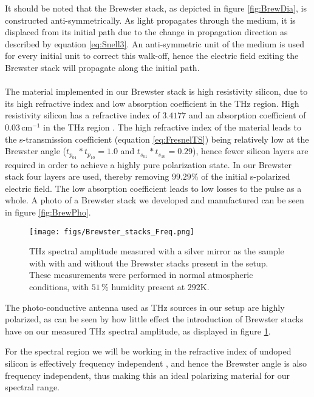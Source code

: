 It should be noted that the Brewster stack, as depicted in figure \ref{fig:BrewDia}, is constructed anti-symmetrically. As light propagates through the medium, it is displaced from its initial path due to the change in propagation direction as described by equation \ref{eq:Snell3}. An anti-symmetric unit of the medium is used for every initial unit to correct this walk-off, hence the electric field exiting the Brewster stack will propagate along the initial path.
\paragraph{}
The material implemented in our Brewster stack is high resistivity silicon, due to its high refractive index and low absorption coefficient in the THz region. High resistivity silicon has a refractive index of $3.4177$ and an absorption coefficient of $0.03\,\text{cm}^{-1}$ in the THz region \cite{Li-2008,Jepsen-2007, Grischkowsky1990}. The high refractive index of the material leads to the s-transmission coefficient (equation \ref{eq:FresnelTS}) being relatively low at the Brewster angle ($t_{p_{01}}*t_{p_{10}} = 1.0$ and $t_{s_{01}}*t_{s_{10}} = 0.29$), hence fewer silicon layers are required in order to achieve a highly pure polarization state. In our Brewster stack four layers are used, thereby removing $99.29\%$ of the initial s-polarized electric field. The low absorption coefficient leads to low losses to the pulse as a whole. A photo of a Brewster stack we developed and manufactured can be seen in figure \ref{fig:BrewPho}.

\begin{figure}[H]
\begin{center}
	 \texttt{[image: figs/Brewster\_stacks\_Freq.png]}
	 \caption[Spectrum with and without Brewster stacks]{THz spectral amplitude measured with a silver mirror as the sample with with and without the Brewster stacks present in the setup. These measurements were performed in normal atmospheric conditions, with $51\,\%$ humidity present at $292$K.}
   \label{fig:BrewSpec}
\end{center}
\end{figure}

The photo-conductive antenna used as THz sources in our setup are highly polarized, as can be seen by how little effect the introduction of Brewster stacks have on our measured THz spectral amplitude, as displayed in figure \ref{fig:BrewSpec}.

For the spectral region we will be working in the refractive index of undoped silicon is effectively frequency independent \cite{Li-2008,Jepsen-2007,Grischkowsky1990}, and hence the Brewster angle is also frequency independent, thus making this an ideal polarizing material for our spectral range.

